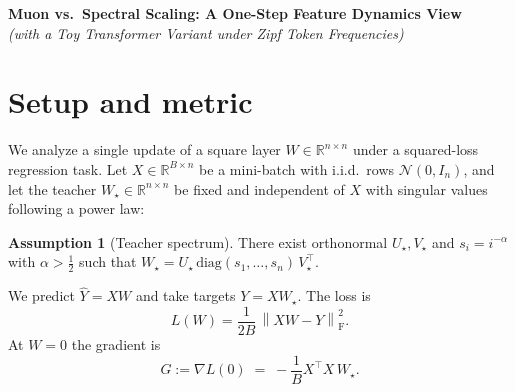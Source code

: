 \documentclass[11pt]{article}
\theoremstyle{definition}
\newtheorem{assumption}{Assumption}
\newcommand{\fro}{\mathrm{F}}
\newcommand{\R}{\mathbb{R}}
\newcommand{\norm}[1]{\left\lVert#1\right\rVert}
\begin{document}
\begin{center}
{\LARGE \bf Muon vs.\ Spectral Scaling: A One-Step Feature Dynamics View}\\[6pt]
{\large \emph{(with a Toy Transformer Variant under Zipf Token Frequencies)}}
\end{center}

\vspace{0.5em}

\begin{abstract}
We study one-step feature changes induced by (i) gradient descent (GD) with the default layerwise spectral scaling from the paper under discussion, and (ii) the Muon (matrix-sign/polar) update. Under mild conditions (power-law teacher spectrum with exponent $>\tfrac12$, bounded feature variances), GD induces an $O(1)$ feature root-mean-square (RMS) change that is \emph{uniform} in width $n$ and batch size $B$. In contrast, Muon induces an RMS change of order $\Theta(\sqrt{r_{\mathrm{eff}}})$, where $r_{\mathrm{eff}}=\min\{n,B\}$ in the basic linear model and $r_{\mathrm{eff}}=\min\{n,D_B\}$ in a toy transformer with Zipf token frequencies ($D_B$ = \#distinct tokens in batch). This yields a clear \emph{knee}: $\sqrt{n}$ growth when width is the bottleneck and a plateau at $\sqrt{B}$ (or $\sqrt{D_B}$) when effective rank saturates. We argue this scaling gap makes Muon \emph{incompatible} with spectral scaling if the goal is width-invariant feature motion, and we formalize the conditions under which the incompatibility arises.
\end{abstract}

\section{Setup and metric}

We analyze a single update of a square layer $W\in\R^{n\times n}$ under a squared-loss regression task. Let $X\in\R^{B\times n}$ be a mini-batch with i.i.d.\ rows $\mathcal{N}(0,I_n)$, and let the teacher $W_\star\in\R^{n\times n}$ be fixed and independent of $X$ with singular values following a power law:
\begin{assumption}[Teacher spectrum]\label{ass:teacher}
There exist orthonormal $U_\star,V_\star$ and $s_i=i^{-\alpha}$ with $\alpha>\tfrac12$ such that
$W_\star=U_\star\,\mathrm{diag}(s_1,\dots,s_n)\,V_\star^\top$.
\end{assumption}

We predict $\hat Y=XW$ and take targets $Y=XW_\star$. The loss is
\[
L(W)=\frac{1}{2B}\,\norm{XW-Y}_\fro^2.
\]
At $W=0$ the gradient is
\begin{equation}\label{eq:G}
G:=\nabla L(0) \;=\; -\frac1B X^\top X\, W_\star.
\end{equation}
\end{document}
